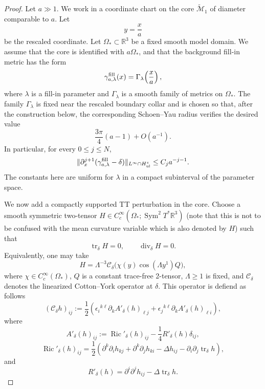 \documentclass{amsart}
\begin{document}
{\begin{proof}
\noindent Let \(a\gg1\). We work in a coordinate chart on the core
\(\widetilde{\mathcal M}_1\) of diameter comparable to \(a\). Let
\[
        y=\frac{x}{a}
\]
be the rescaled coordinate. Let \(\Omega_\ast\subset\mathbb R^3\) be a
fixed smooth model domain. We assume that the core is identified with
\(a\Omega_\ast\), and that the background fill-in metric has the form
\[
        \gamma^{\rm fill}_{a,\lambda}(x)
        =
        \Gamma_\lambda\!\left(\frac{x}{a}\right),
\]
where \(\lambda\) is a fill-in parameter and \(\Gamma_\lambda\) is a
smooth family of metrics on \(\Omega_\ast\). The family
\(\Gamma_\lambda\) is fixed near the rescaled boundary collar and is
chosen so that, after the construction below, the corresponding
Schoen--Yau radius verifies the desired value
\[
        \frac{3\pi}{4}(a-1)+O(a^{-1}).
\]
In particular, for every \(0\le j\le N\),
\begin{equation}
\label{eq:fill-derivative-bound}
        \|\partial_x^{j+1}
        (\gamma^{\rm fill}_{a,\lambda}-\delta)\|_{L^\infty\cap H^s_{\rm ul}}
        \le C_j a^{-j-1}.
\end{equation}
The constants here are uniform for \(\lambda\) in a compact subinterval of
the parameter space.

\noindent We now add a compactly supported TT perturbation in the core. Choose a
smooth symmetric two-tensor \(H\in C_c^\infty(\Omega_\ast;\operatorname{Sym}^2T^*\mathbb R^3)\) (note that this is not to be confused with the mean curvature variable which is also denoted by $H$)
such that
\[
        \operatorname{tr}_{\delta}H=0,
        \qquad
        \operatorname{div}_{\delta}H=0.
\]
Equivalently, one may take
\[
        H
        =
        \Lambda^{-3}\mathcal C_\delta
        \bigl(
        \chi(y)\cos(\Lambda y^1)Q
        \bigr),
\]
where \(\chi\in C_c^\infty(\Omega_\ast)\), \(Q\) is a constant
trace-free 2-tensor, \(\Lambda\ge1\) is fixed, and
\(\mathcal C_\delta\) denotes the linearized Cotton--York operator at
\(\delta\). This operator is defiend as follows 
\[
        (\mathcal C_\delta h)_{ij}
        :=
        \frac12
        \left(
        \epsilon_i{}^{k\ell}\partial_k A'_\delta(h)_{\ell j}
        +
        \epsilon_j{}^{k\ell}\partial_k A'_\delta(h)_{\ell i}
        \right),
\]
where
\[
        A'_\delta(h)_{ij}
        :=
        \operatorname{Ric}'_\delta(h)_{ij}
        -
        \frac14 R'_\delta(h)\delta_{ij},
\]
\[
        \operatorname{Ric}'_\delta(h)_{ij}
        =
        \frac12
        \left(
        \partial^k\partial_i h_{kj}
        +
        \partial^k\partial_j h_{ki}
        -
        \Delta h_{ij}
        -
        \partial_i\partial_j\operatorname{tr}_\delta h
        \right),
\]
and
\[
        R'_\delta(h)
        =
        \partial^i\partial^j h_{ij}
        -
        \Delta\operatorname{tr}_\delta h .
\]


\end{proof}}
\end{document}
